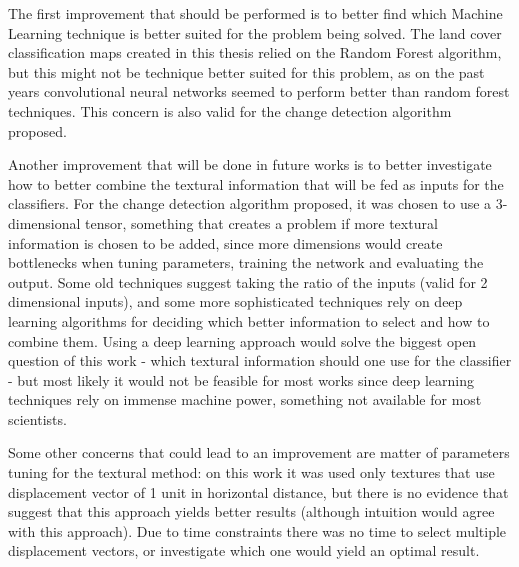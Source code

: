 The first improvement that should be performed is to better find which Machine Learning technique is better suited for the problem being solved. The land cover classification maps created in this thesis relied on the Random Forest algorithm, but this might not be technique better suited for this problem, as on the past years convolutional neural networks seemed to perform better than random forest techniques. This concern is also valid for the change detection algorithm proposed.

Another improvement that will be done in future works is to better investigate how to better combine the textural information that will be fed as inputs for the classifiers. For the change detection algorithm proposed, it was chosen to use a 3-dimensional tensor, something that creates a problem if more textural information is chosen to be added, since more dimensions would create bottlenecks when tuning parameters, training the network and evaluating the output. Some old techniques suggest taking the ratio of the inputs (valid for 2 dimensional inputs), and some more sophisticated techniques rely on deep learning algorithms for deciding which better information to select and how to combine them. Using a deep learning approach would solve the biggest open question of this work - which textural information should one use for the classifier - but most likely it would not be feasible for most works since deep learning techniques rely on immense machine power, something not available for most scientists. 

Some other concerns that could lead to an improvement are matter of parameters tuning for the textural method: on this work it was used only textures that use displacement vector of 1 unit in horizontal distance, but there is no evidence that suggest that this approach yields better results (although intuition would agree with this approach). Due to time constraints there was no time to select multiple displacement vectors, or investigate which one would yield an optimal result.


